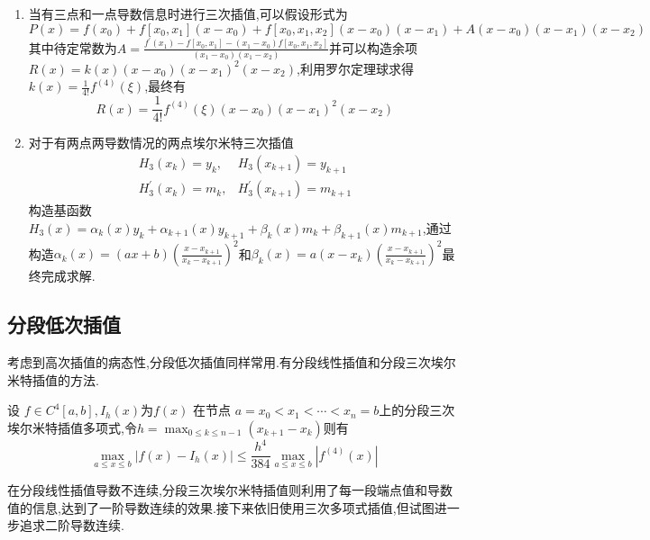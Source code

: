 \documentclass[10pt]{yerbaformat}
\begin{document}
\begin{enumerate}
    \item 当有三点和一点导数信息时进行三次插值,可以假设形式为$$P(x)=f\left(x_{0}\right) +f\left[x_{0}, x_{1}\right]\left(x-x_{0}\right)
              +f\left[x_{0}, x_{1}, x_{2}\right]\left(x-x_{0}\right)\left(x-x_{1}\right)
              +A\left(x-x_{0}\right)\left(x-x_{1}\right)\left(x-x_{2}\right)$$其中待定常数为$A=\frac{f^{\prime}\left(x_{1}\right)-f\left[x_{0}, x_{1}\right]-\left(x_{1}-x_{0}\right) f\left[x_{0}, x_{1}, x_{2}\right]}{\left(x_{1}-x_{0}\right)\left(x_{1}-x_{2}\right)}$并可以构造余项$R(x)=k(x)\left(x-x_{0}\right)\left(x-x_{1}\right)^{2}\left(x-x_{2}\right)$,利用罗尔定理球求得$k(x)=\frac{1}{4 !} f^{(4)}(\xi)$,最终有$$R(x)=\frac{1}{4 !} f^{(4)}(\xi)\left(x-x_{0}\right)\left(x-x_{1}\right)^{2}\left(x-x_{2}\right)$$
    \item 对于有两点两导数情况的两点埃尔米特三次插值$$\begin{array}{ll}
                  H_{3}\left(x_{k}\right)=y_{k},          & H_{3}\left(x_{k+1}\right)=y_{k+1}          \\
                  H_{3}^{\prime}\left(x_{k}\right)=m_{k}, & H_{3}^{\prime}\left(x_{k+1}\right)=m_{k+1}
              \end{array}$$构造基函数$H_{3}(x)=\alpha_{k}(x) y_{k}+\alpha_{k+1}(x) y_{k+1}+\beta_{k}(x) m_{k}+\beta_{k+1}(x) m_{k+1}$,通过构造$\alpha_{k}(x)=(a x+b)\left(\frac{x-x_{k+1}}{x_{k}-x_{k+1}}\right)^{2}$和$\beta_{k}(x)=a\left(x-x_{k}\right)\left(\frac{x-x_{k+1}}{x_{k}-x_{k+1}}\right)^{2}$最终完成求解.
\end{enumerate}

\subsection{分段低次插值}

\par 考虑到高次插值的病态性,分段低次插值同样常用.有分段线性插值和分段三次埃尔米特插值的方法.

\begin{theorem}
    设 $f \in C^{4}[a, b], I_{h}(x)$为$f(x)$ 在节点
    $a=x_{0}<x_{1}<\cdots<x_{n}=b$上的分段三次埃尔米特插值多项式,令$h=\max _{0 \leq k \leq n-1}\left(x_{k+1}-x_{k}\right)$则有$$\max _{a \leq x \leq b}\left|f(x)-I_{h}(x)\right| \leq \frac{h^{4}}{384} \max _{a \leq x \leq b}\left|f^{(4)}(x)\right| $$
\end{theorem}

\par 在分段线性插值导数不连续,分段三次埃尔米特插值则利用了每一段端点值和导数值的信息,达到了一阶导数连续的效果.接下来依旧使用三次多项式插值,但试图进一步追求二阶导数连续.
\end{document}
